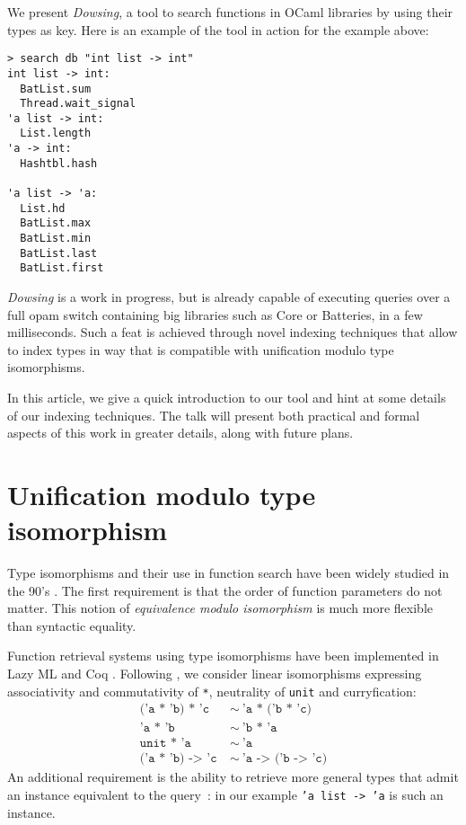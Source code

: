 \documentclass [a4paper,11pt]{scrartcl}
\newcommand{\dowsing}{\textit{Dowsing}\xspace}
\begin{document}
We present \dowsing, a tool to search functions in OCaml libraries by
using their types as key.
Here is an example of the tool in action for the example above:

\begin{lstlisting}[multicols=2]
> search db "int list -> int"
int list -> int:
  BatList.sum
  Thread.wait_signal
'a list -> int:
  List.length
'a -> int:
  Hashtbl.hash
  
'a list -> 'a:
  List.hd
  BatList.max
  BatList.min
  BatList.last
  BatList.first
\end{lstlisting}

\dowsing is a work in progress, but is already capable of
executing queries over a full opam switch
containing big libraries such as Core or Batteries, in a few milliseconds.
Such a feat is achieved through novel indexing techniques that allow
to index types in way that is compatible with unification modulo type
isomorphisms.

In this article, we give a quick introduction to our tool and hint at some
details of our indexing techniques. The talk will present both practical
and formal aspects of this work in greater details, along with
future plans.



\section{Unification modulo type isomorphism}

Type isomorphisms and their use in function search have been widely studied in the 90's \cite {rittri,dicosmo,DBLP:journals/jsyml/NarendranPS97}. The first requirement is that the order of function parameters do not matter.
This notion of \textit {equivalence modulo isomorphism} is much more flexible than syntactic equality. 

Function retrieval systems using type isomorphisms have been implemented in Lazy ML \cite {rittri} and Coq \cite {delahaye}. Following \cite {rittri}, we consider linear isomorphisms expressing associativity and commutativity of \texttt {*}, neutrality of \texttt {unit} and curryfication:
\begin {align*}
  \texttt {('a * 'b) * 'c} &\ \sim\ \texttt {'a * ('b * 'c)} \\
  \texttt {'a * 'b} &\ \sim\ \texttt {'b * 'a} \\
  \texttt {unit * 'a} &\ \sim\ \texttt {'a} \\
  \texttt {('a * 'b) -> 'c} &\ \sim\ \texttt {'a -> ('b -> 'c)}
\end {align*}
An additional requirement is the ability to retrieve more general types that admit an instance equivalent to the query~: in our example \texttt {'a list -> 'a} is such an instance. 
\end{document}
